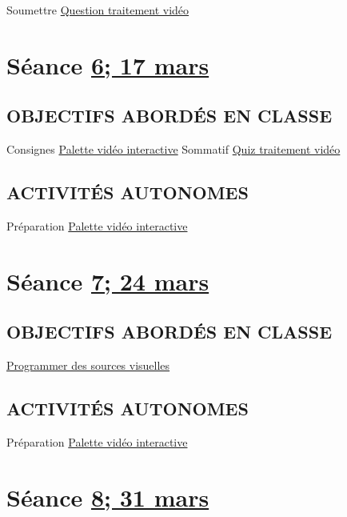 \documentclass[
]{book}
\begin{document}
Soumettre \protect\hyperlink{sommatif_2}{Question traitement vidéo}

\hypertarget{semaine_7}{%
\section{\texorpdfstring{Séance \protect\hyperlink{semaine_7}{6; 17 mars}}{Séance 6; 17 mars}}\label{semaine_7}}

\hypertarget{objectifs-aborduxe9s-en-classe-6}{%
\subsection{OBJECTIFS ABORDÉS EN CLASSE}\label{objectifs-aborduxe9s-en-classe-6}}

Consignes \protect\hyperlink{sommatif_4}{Palette vidéo interactive}
Sommatif \protect\hyperlink{sommatif_3}{Quiz traitement vidéo}

\hypertarget{activituxe9s-autonomes-6}{%
\subsection{ACTIVITÉS AUTONOMES}\label{activituxe9s-autonomes-6}}

Préparation \protect\hyperlink{sommatif_4}{Palette vidéo interactive}

\hypertarget{semaine_8}{%
\section{\texorpdfstring{Séance \protect\hyperlink{semaine_8}{7; 24 mars}}{Séance 7; 24 mars}}\label{semaine_8}}

\hypertarget{objectifs-aborduxe9s-en-classe-7}{%
\subsection{OBJECTIFS ABORDÉS EN CLASSE}\label{objectifs-aborduxe9s-en-classe-7}}

\protect\hyperlink{programmer}{Programmer des sources visuelles}

\hypertarget{activituxe9s-autonomes-7}{%
\subsection{ACTIVITÉS AUTONOMES}\label{activituxe9s-autonomes-7}}

Préparation \protect\hyperlink{sommatif_4}{Palette vidéo interactive}

\hypertarget{semaine_9}{%
\section{\texorpdfstring{Séance \protect\hyperlink{semaine_9}{8; 31 mars}}{Séance 8; 31 mars}}\label{semaine_9}}
\end{document}
